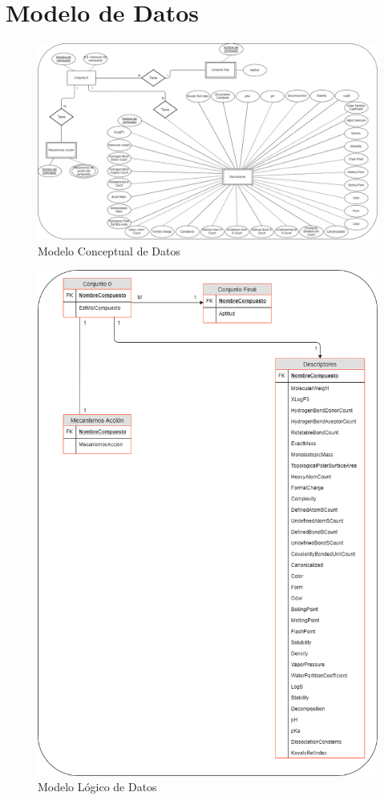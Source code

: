 \section{Modelo de Datos}
\begin{figure}[H]
    \centering
    \includegraphics[scale=0.3]{Capitulo2/images/ModeloConceptualDatos.png}
    \caption{Modelo Conceptual de Datos}
    \label{modelo_conceptual}
\end{figure}
\begin{figure}[H]
    \centering
    \includegraphics[scale=0.4]{Capitulo2/images/modeloDatosLogico.png}
    \caption{Modelo Lógico de Datos}
    \label{fig:my_label}
\end{figure}
